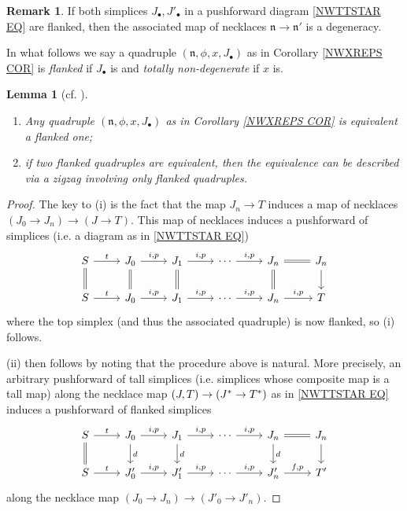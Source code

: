 \documentclass[a4paper,10pt
,draft
]{article}%
\numberwithin{equation}{section}
\numberwithin{figure}{section}
\newtheorem{lemma}[equation]{Lemma}%
\theoremstyle{definition} %
\newtheorem{remark}[equation]{Remark}%
\newcommand{\1}{\ensuremath{\mathbbm 1}}%
\begin{document}
\begin{remark}\label{FLNKNECDEG REM}
	If both simplices 
	$J_{\bullet},J'_{\bullet}$ in a pushforward diagram
	\eqref{NWTTSTAR EQ}
	are flanked,
	then the associated map of necklaces
	$\mathfrak{n} \to \mathfrak{n}'$
	is a degeneracy.
\end{remark}


In what follows we say a quadruple
$(\mathfrak{n},\phi,x,J_{\bullet})$
as in Corollary \ref{NWXREPS COR}
is \emph{flanked} if $J_{\bullet}$ is and
\emph{totally non-degenerate} if $x$ is.


\begin{lemma}[{cf. \cite[Lemma 4.5]{DS11}}]
	\label{FLANKING LEM}
	\begin{enumerate}[label=(\roman*)]
		\item Any quadruple $(\mathfrak{n},\phi,x,J_{\bullet})$
		as in Corollary \ref{NWXREPS COR} is equivalent a flanked one;
		\item if two flanked quadruples are equivalent, then the equivalence can be described via a zigzag involving only flanked quadruples.
	\end{enumerate}
\end{lemma}


\begin{proof}
	The key to (i) is the fact that 
	the map $J_n \to T$
	induces a map of necklaces
	$(J_0 \to J_n) \to (J \to T)$.
	This map of necklaces induces a pushforward of simplices
	(i.e. a diagram as in \eqref{NWTTSTAR EQ})
\begin{equation}\label{FLANKING EQ}
\begin{tikzcd}
	S \ar{r}{t} \ar[equal]{d}
&
	J_0 \ar{r}{i,p} \ar[equal]{d}
&
	J_1 \ar{r}{i,p} \ar[equal]{d}
&
	\cdots
	\ar{r}{i,p}
&
	J_n \ar[equal]{r} \ar[equal]{d}
&
	J_n \ar{d}
\\
	S \ar{r}{t}
&
	J_0 \ar{r}{i,p}
&
	J_1 \ar{r}{i,p}
&
	\cdots
	\ar{r}{i,p}
&
	J_n \ar{r}{i,p}
&
	T
\end{tikzcd}
\end{equation}	
	where the top simplex (and thus the associated quadruple) is now flanked, so (i) follows.

	(ii) then follows by noting that the procedure above is natural.
	More precisely, 
	an arbitrary pushforward of tall simplices
	(i.e. simplices whose composite map is a tall map)
	along the necklace map $(J,T) \to (J^{\**} \to T^{\**})$
	as in \eqref{NWTTSTAR EQ}
	induces a pushforward of flanked simplices
\begin{equation}
\begin{tikzcd}
	S \ar{r}{t} \ar[equal]{d}
&
	J_0 \ar{r}{i,p} \ar{d}{d}
&
	J_1 \ar{r}{i,p} \ar{d}{d}
&
	\cdots \ar{r}{i,p}
&
	J_n \ar[equal]{r} \ar{d}{d}
&
	J_n \ar{d}
\\
	S \ar{r}{t} 
&
	J'_0 \ar{r}{i,p}
&
	J'_1 \ar{r}{i,p}
&
	\cdots \ar{r}{i,p}
&
	J'_n \ar{r}{f,p}
&
	T'
\end{tikzcd}
\end{equation}
along the necklace map
$(J_0 \to J_n) \to (J'_0 \to J'_n)$.
\end{proof}
\end{document}
